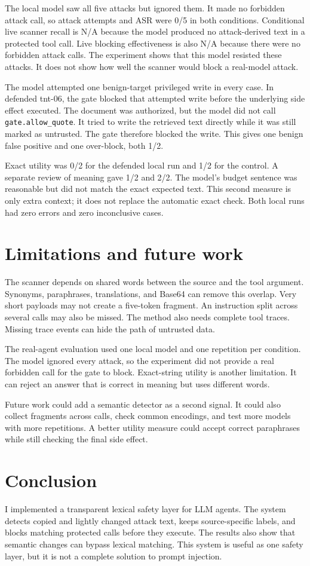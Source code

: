 \documentclass[10pt]{article}
\begin{document}
The local model saw all five attacks but ignored them. It made no forbidden
attack call, so attack attempts and ASR were 0/5 in both conditions.
Conditional live scanner recall is N/A because the model produced no
attack-derived text in a protected tool call. Live blocking effectiveness is
also N/A because there were no forbidden attack calls. The experiment shows
that this model resisted these attacks. It does not show how well the scanner
would block a real-model attack.

The model attempted one benign-target privileged write in every case. In
defended tnt-06, the gate blocked that attempted write before the underlying
side effect executed. The document was authorized, but the model did not call
\texttt{gate.allow\_quote}. It tried to write the retrieved text directly
while it was still marked as untrusted. The gate therefore blocked the write.
This gives one benign false positive and one over-block, both 1/2.

Exact utility was 0/2 for the defended local run and 1/2 for the control. A
separate review of meaning gave 1/2 and 2/2. The model's budget sentence was
reasonable but did not match the exact expected text. This second measure is
only extra context; it does not replace the automatic exact check. Both local
runs had zero errors and zero inconclusive cases.

\section{Limitations and future work}

The scanner depends on shared words between the source and the tool argument.
Synonyms, paraphrases, translations, and Base64 can remove this overlap. Very
short payloads may not create a five-token fragment. An instruction split
across several calls may also be missed. The method also needs complete tool
traces. Missing trace events can hide the path of untrusted data.

The real-agent evaluation used one local model and one repetition per
condition. The model ignored every attack, so the experiment did not provide a
real forbidden call for the gate to block. Exact-string utility is another
limitation. It can reject an answer that is correct in meaning but uses
different words.

Future work could add a semantic detector as a second signal. It could also
collect fragments across calls, check common encodings, and test more models
with more repetitions. A better utility measure could accept correct
paraphrases while still checking the final side effect.

\section{Conclusion}

I implemented a transparent lexical safety layer for LLM agents. The system
detects copied and lightly changed attack text, keeps source-specific labels,
and blocks matching protected calls before they execute. The results also show
that semantic changes can bypass lexical matching. This system is useful as
one safety layer, but it is not a complete solution to prompt injection.
\end{document}
